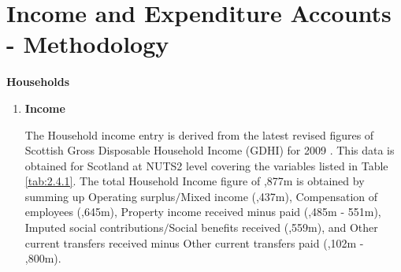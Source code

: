 \newpage
\section{Income and Expenditure Accounts - Methodology}
\label{sec:2.5}

\bigskip
\begin{center}
\textbf{\LARGE Households}
\end{center}

\begin{enumerate}


\item \textbf {Income}

\bigskip

The Household income entry is derived from the latest revised figures of Scottish Gross Disposable Household Income (GDHI) for 2009 \cite{ONS2013a}. This data is obtained for Scotland at NUTS2 level covering the variables listed in Table \ref{tab:2.4.1}. The total Household Income figure of ,877m is obtained by summing up Operating surplus$/$Mixed income (,437m), Compensation of employees (,645m), Property income received minus paid (,485m - \textsterling551m), Imputed social contributions$/$Social benefits received (,559m), and Other current transfers received minus Other current transfers paid (,102m - ,800m).    

\bigskip


\end{enumerate}
